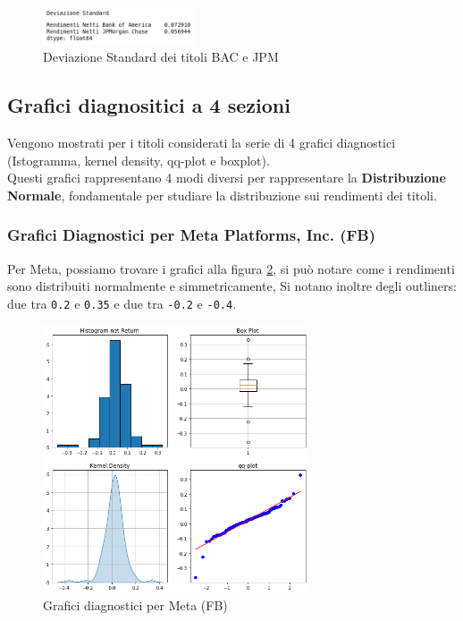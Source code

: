 \documentclass{article}
\begin{document}
\begin{figure}[h]
  \centering
  \includegraphics[width=0.4\textwidth]{ds_banc.png}
  \caption{Deviazione Standard dei titoli BAC e JPM}
  \label{fig:ds_banc}
\end{figure}

\pagebreak

\subsection{Grafici diagnositici a 4 sezioni}

Vengono mostrati per i titoli considerati la serie di 4 grafici diagnostici (Istogramma, kernel density, qq-plot e boxplot).\\
Questi grafici rappresentano 4 modi diversi per rappresentare la \textbf{Distribuzione Normale}, fondamentale per studiare la distribuzione sui rendimenti dei titoli.

\subsubsection{Grafici Diagnostici per Meta Platforms, Inc. (FB)}

Per Meta, possiamo trovare i grafici alla figura \ref{fig:meta_diagn}, si può notare come i rendimenti sono distribuiti normalmente e simmetricamente,
Si notano inoltre degli outliners: due tra \verb|0.2| e \verb|0.35| e due tra \verb|-0.2| e \verb|-0.4|.

\begin{figure}[h]
  \centering
  \includegraphics[width=0.7\textwidth]{meta_diagn.png}
  \caption{Grafici diagnostici per Meta (FB)}
  \label{fig:meta_diagn}
\end{figure}
\end{document}
